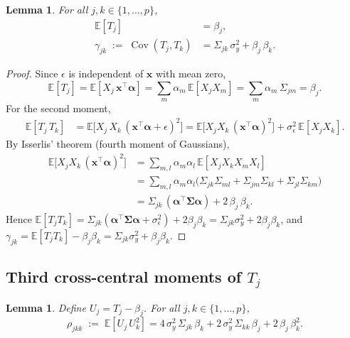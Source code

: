 \documentclass[11pt]{article}
\newcommand{\Cov}{\operatorname{Cov}}
\newcommand{\E}{\mathbb{E}}
\newcommand{\bSig}{\boldsymbol{\Sigma}}
\newcommand{\balpha}{\boldsymbol{\alpha}}
\newcommand{\bx}{\mathbf{x}}
\theoremstyle{plain}
\newtheorem{lemma}[theorem]{Lemma}
\theoremstyle{definition}
\theoremstyle{remark}
\begin{document}
\begin{lemma}\label{lem:EandCov}
For all $j,k\in\{1,\dots,p\}$,
\begin{align}
    \E[T_j] &= \beta_j,  \label{eq:ET}\\
    \gamma_{jk}
    \;:=\; \Cov(T_j,T_k)
    &= \Sigma_{jk}\,\sigma_y^2 + \beta_j\,\beta_k . \label{eq:gamma}
\end{align}
\end{lemma}

\begin{proof}
Since $\epsilon$ is independent of $\bx$ with mean zero,
\[
    \E[T_j]
    = \E[X_j\,\bx^\top\balpha]
    = \sum_m \alpha_m\,\E[X_j X_m]
    = \sum_m \alpha_m\,\Sigma_{jm}
    = \beta_j.
\]
For the second moment,
\begin{align*}
    \E[T_j\,T_k]
    &= \E\bigl[X_j\,X_k\,(\bx^\top\balpha+\epsilon)^2\bigr]
    = \E\bigl[X_j X_k\,(\bx^\top\balpha)^2\bigr]
      + \sigma_\epsilon^2\,\E[X_j X_k].
\end{align*}
By Isserlis' theorem (fourth moment of Gaussians),
\begin{align*}
    \E\bigl[X_j X_k\,(\bx^\top\balpha)^2\bigr]
    &= \sum_{m,l}\alpha_m\alpha_l\,\E[X_j X_k X_m X_l]\\
    &= \sum_{m,l}\alpha_m\alpha_l
       \bigl(\Sigma_{jk}\Sigma_{ml}
             +\Sigma_{jm}\Sigma_{kl}
             +\Sigma_{jl}\Sigma_{km}\bigr)\\
    &= \Sigma_{jk}\,(\balpha^\top\bSig\balpha)
       + 2\,\beta_j\,\beta_k.
\end{align*}
Hence
$\E[T_j T_k]
= \Sigma_{jk}(\balpha^\top\bSig\balpha + \sigma_\epsilon^2) + 2\beta_j\beta_k
= \Sigma_{jk}\sigma_y^2 + 2\beta_j\beta_k$,
and $\gamma_{jk} = \E[T_j T_k] - \beta_j\beta_k
= \Sigma_{jk}\sigma_y^2 + \beta_j\beta_k$.
\end{proof}

\subsection{Third cross-central moments of $T_j$}

\begin{lemma}\label{lem:third}
Define $U_j = T_j - \beta_j$. For all $j,k\in\{1,\dots,p\}$,
\begin{equation}\label{eq:rho}
    \rho_{jkk}
    \;:=\; \E[U_j\,U_k^2]
    = 4\,\sigma_y^2\,\Sigma_{jk}\,\beta_k
      + 2\,\sigma_y^2\,\Sigma_{kk}\,\beta_j
      + 2\,\beta_j\,\beta_k^2.
\end{equation}
\end{lemma}
\end{document}

